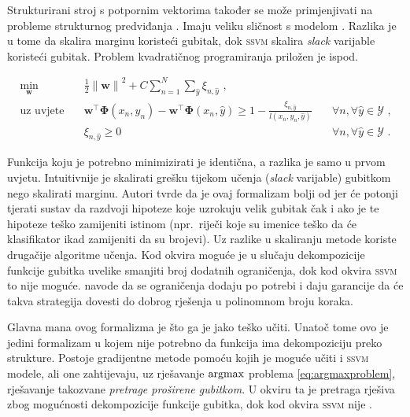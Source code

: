 Strukturirani stroj s potpornim vektorima  također se može primjenjivati na probleme strukturnog
predviđanja \citep{tsochantaridis2005large}. Imaju veliku sličnost s modelom
\mmmm{}. Razlika je u tome da \mmmm{} skalira marginu koristeći gubitak, dok
\textsc{ssvm} skalira \textit{slack} varijable koristeći gubitak. Problem
kvadratičnog programiranja priložen je ispod.

\begin{equation}\label{eq:ssvm}
\begin{aligned}
  \min_{\mathbf{w}} & \quad \frac{1}{2} {\lVert\mathbf{w}\lVert}^2 + C \sum_{n=1}^{N}\sum_{\hat{y}} \xi_{n,\hat{y}} \text{ ,}              & \\
  \text{uz uvjete}  & \quad \mathbf{w}^\top \mathbf{\Phi}(x_n, y_n) - \mathbf{w}^\top \mathbf{\Phi}(x_n, \hat{y}) \ge 1 - \frac{\xi_{n,\hat{y}}}{l(x_n, y_n, \hat{y})} & \quad \forall n, \forall \hat{y} \in \mathcal{Y} \text{ ,}\\
                    & \quad \xi_{n,\hat{y}} \ge 0                                                                                          & \quad \forall n, \forall \hat{y} \in \mathcal{Y} \text{ .}
\end{aligned}
\end{equation}

Funkcija koju je potrebno minimizirati je identična, a razlika je samo u prvom
uvjetu. Intuitivnije je skalirati grešku tijekom učenja (\textit{slack}
varijable) gubitkom nego skalirati marginu. Autori tvrde da je ovaj formalizam
bolji od \mmmm{} jer će potonji tjerati sustav da razdvoji hipoteze koje
uzrokuju velik gubitak čak i ako je te hipoteze teško zamijeniti istinom
(npr.~riječi koje su imenice teško da će klasifikator ikad zamijeniti da su
brojevi). Uz razlike u skaliranju metode koriste drugačije algoritme učenja. Kod
\mmmm{} okvira moguće je u slučaju dekompozicije funkcije gubitka uvelike
smanjiti broj dodatnih ograničenja, dok kod okvira \textsc{ssvm} to nije moguće.
\citet{tsochantaridis2005large} navode da se ograničenja dodaju po potrebi i
daju garancije da će takva strategija dovesti do dobrog rješenja u polinomnom
broju koraka.

Glavna mana ovog formalizma je što ga je jako teško učiti. Unatoč tome ovo je
jedini formalizam u kojem nije potrebno da funkcija ima dekompoziciju preko
strukture. Postoje gradijentne metode pomoću kojih je moguće učiti \mmmm{} i
\textsc{ssvm} modele, ali one zahtijevaju, uz rješavanje $\operatorname*{argmax}$ problema
\ref{eq:argmaxproblem}, rješavanje takozvane \textit{pretrage proširene
gubitkom}. U \mmmm{} okviru ta je pretraga rješiva zbog mogućnosti dekompozicije
funkcije gubitka, dok kod okvira \textsc{ssvm} nije \citep{ratliff2006maximum}.
